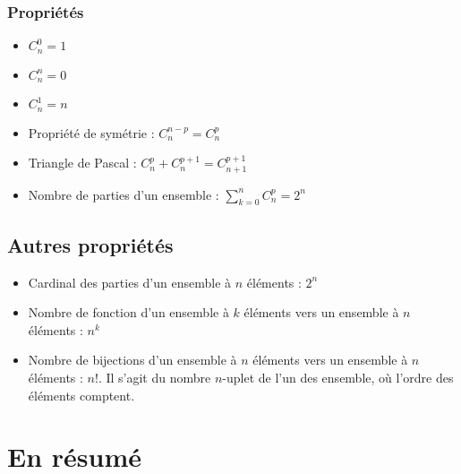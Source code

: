 \documentclass[french]{yLectureNote}
\begin{document}
\subsubsection{Propriétés}
\begin{itemize}
 \item $C^0_n = 1$
 \item $C^n_n = 0$
 \item $C^1_n = n$
 \item Propriété de symétrie : $C^{n-p}_n = C^p_n$
 \item Triangle de Pascal : $C^p_n + C^{p+1}_n = C^{p+1}_{n+1}$
 \item Nombre de parties d'un ensemble : $\sum^n_{k=0} C^p_n = 2^n$
\end{itemize}
\subsection{Autres propriétés}
\begin{itemize}
 \item Cardinal des parties d'un ensemble à $n$ éléments : $2^n$
 \item Nombre de fonction d'un ensemble à $k$ éléments vers un ensemble à $n$ éléments : $n^k$
 \item Nombre de bijections d'un ensemble à $n$ éléments vers un ensemble à $n$ éléments : $n!$. Il s'agit du nombre $n$-uplet de l'un des ensemble, où l'ordre des éléments comptent.
\end{itemize}
\section{En résumé}
\end{document}
